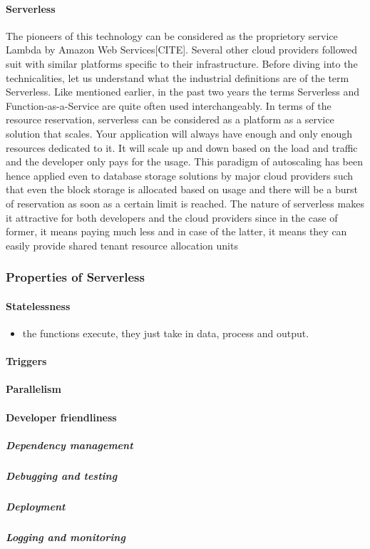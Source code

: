 \documentclass[12pt]{article}
\begin{document}
\paragraph{Serverless}
\label{sec:org07d98e2}
The pioneers of this technology can be considered as the proprietory service
Lambda by Amazon Web Services[CITE]. Several other cloud providers followed suit
with similar platforms specific to their infrastructure.
Before diving into the technicalities, let us understand what the industrial
definitions are of the term Serverless.
Like mentioned earlier, in the past two years the terms Serverless and Function-as-a-Service are quite
often used interchangeably. In terms of the resource reservation, serverless can
be considered as a platform as a service solution that scales. Your application
will always have enough and only enough resources dedicated to it. It will scale
up and down based on the load and traffic and the developer only pays for the usage.
This paradigm of autoscaling has been hence applied even to database storage
solutions by major cloud providers such that even the block storage is allocated
based on usage and there will be a burst of reservation as soon as a certain
limit is reached.
The nature of serverless makes it attractive for both developers and the cloud
providers since in the case of former, it means paying much less and in case of
the latter, it means they can easily provide shared tenant resource allocation units


\subsubsection{Properties of Serverless}
\label{sec:orgb184a1f}
\paragraph{Statelessness}
\label{sec:orgd6ddd6f}
\begin{itemize}
\item the functions execute, they just take in data, process and output.
\end{itemize}
\paragraph{Triggers}
\label{sec:orgfb16546}
\paragraph{Parallelism}
\label{sec:org1d33ec6}
\paragraph{Developer friendliness}
\label{sec:org3c860f3}
\subparagraph{Dependency management}
\label{sec:orge7e98bd}
\subparagraph{Debugging and testing}
\label{sec:org63b3cff}
\subparagraph{Deployment}
\label{sec:org524535b}
\subparagraph{Logging and monitoring}
\label{sec:org536d03c}
\end{document}
